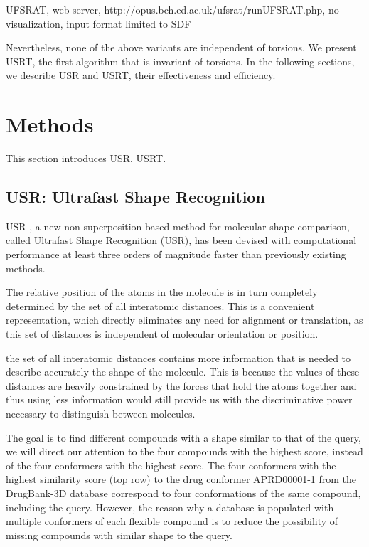 \documentclass[twocolumn]{svjour3}          %
\begin{document}
UFSRAT, web server, http://opus.bch.ed.ac.uk/ufsrat/runUFSRAT.php, no visualization, input format limited to SDF

Nevertheless, none of the above variants are independent of torsions. We present USRT, the first algorithm that is invariant of torsions. In the following sections, we describe USR and USRT, their effectiveness and efficiency.

\section{Methods}

This section introduces USR, USRT.

\subsection{USR: Ultrafast Shape Recognition}

USR \cite{1379,1280}, a new non-superposition based method for molecular shape comparison, called Ultrafast Shape Recognition (USR), has been devised with computational performance at least three orders of magnitude faster than previously existing methods. 

The relative position of the atoms in the molecule is in turn completely determined by the set of all interatomic distances. This is a convenient representation, which directly eliminates any need for alignment or translation, as this set of distances is independent of molecular orientation or position.

the set of all interatomic distances contains more information that is needed to describe accurately the shape of the molecule. This is because the values of these distances are heavily constrained by the forces that hold the atoms together and thus using less information would still provide us with the discriminative power necessary to distinguish between molecules.

The goal is to find different compounds with a shape similar to that of the query, we will direct our attention to the four compounds with the highest score, instead of the four conformers with the highest score. The four conformers with the highest similarity score (top row) to the drug conformer APRD00001-1 from the DrugBank-3D database correspond to four conformations of the same compound, including the query. However, the reason why a database is populated with multiple conformers of each flexible compound is to reduce the possibility of missing compounds with similar shape to the query.
\end{document}
